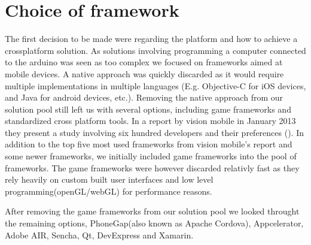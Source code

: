 \section{Choice of framework}
	The first decision to be made were regarding the platform and how to achieve a crossplatform solution. 
	As solutions involving programming a computer connected to the arduino was seen as too complex we focused on frameworks aimed at mobile devices. 
	A native approach was quickly discarded as it would require multiple implementations in multiple languages (E.g. Objective-C for iOS devices, and Java for android devices, etc.). 
	Removing the native approach from our solution pool still left us with several options, including game frameworks and standardized cross platform tools.
	In a report by vision mobile in January 2013 they present a study involving six hundred developers and their preferences (\cite{developerCPT}). 
	In addition to the top five most used frameworks from vision mobile's report and some newer frameworks, we initially included game frameworks into the pool of frameworks. 
	The game frameworks were however discarded relativly fast as they rely heavily on custom built user interfaces and low level programming(openGL/webGL) for performance reasons.
	
	\bigskip\noindent
	After removing the game frameworks from our solution pool we looked throught the remaining options, PhoneGap(also known as Apache Cordova), Appcelerator, Adobe AIR, Sencha, Qt, DevExpress and Xamarin.
	
	
